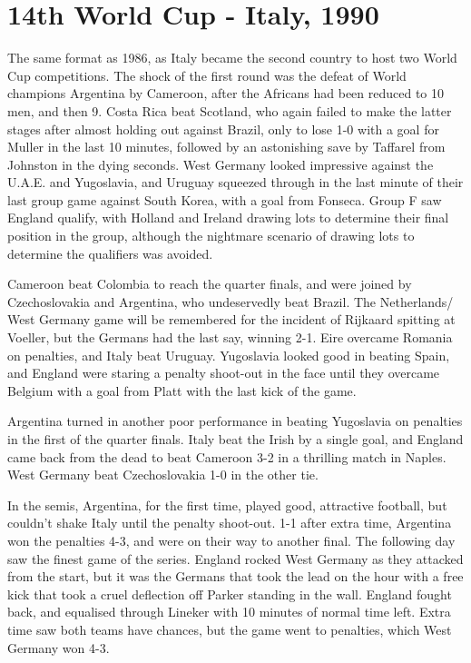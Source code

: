 \section{14th World Cup - Italy, 1990}
The same format as 1986, as Italy became the second country to host two World 
Cup competitions. The shock of the first round was the defeat of World 
champions Argentina by Cameroon, after the Africans had been reduced to 10 men,
and then 9. Costa Rica beat Scotland, who again failed to make the latter 
stages after almost holding out against Brazil, only to lose 1-0 with a goal 
for Muller in the last 10 minutes, followed by an astonishing save by Taffarel 
from Johnston in the dying seconds. West Germany looked impressive against the 
U.A.E. and Yugoslavia, and Uruguay squeezed through in the last minute of their
last group game against South Korea, with a goal from Fonseca. Group F saw 
England qualify, with Holland and Ireland drawing lots to determine their final
position in the group, although the nightmare scenario of drawing lots to 
determine the qualifiers was avoided.

Cameroon beat Colombia to reach the quarter finals, and were joined by 
Czechoslovakia and Argentina, who undeservedly beat Brazil. The Netherlands/
West Germany game will be remembered for the incident of Rijkaard spitting at 
Voeller, but the Germans had the last say, winning 2-1. Eire overcame Romania 
on penalties, and Italy beat Uruguay. Yugoslavia looked good in beating Spain, 
and England were staring a penalty shoot-out in the face until they overcame 
Belgium with a goal from Platt with the last kick of the game.

Argentina turned in another poor performance in beating Yugoslavia on penalties
in the first of the quarter finals. Italy beat the Irish by a single goal, and 
England came back from the dead to beat Cameroon 3-2 in a thrilling match in 
Naples. West Germany beat Czechoslovakia 1-0 in the other tie.

In the semis, Argentina, for the first time, played good, attractive football,
but couldn't shake Italy until the penalty shoot-out. 1-1 after extra time, 
Argentina won the penalties 4-3, and were on their way to another final. The 
following day saw the finest game of the series. England rocked West Germany as
they attacked from the start, but it was the Germans that took the lead on the 
hour with a free kick that took a cruel deflection off Parker standing in the 
wall. England fought back, and equalised through Lineker with 10 minutes of 
normal time left. Extra time saw both teams have chances, but the game went to
penalties, which West Germany won 4-3.

